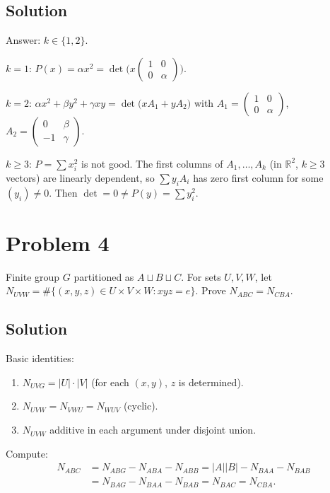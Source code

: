 \documentclass{article}
\begin{document}
\subsection*{Solution}
Answer: $k \in \{1, 2\}$.

$k = 1$: $P(x) = \alpha x^2 = \det\bigl(x \begin{pmatrix}1 & 0\\0 & \alpha\end{pmatrix}\bigr)$.

$k = 2$: $\alpha x^2 + \beta y^2 + \gamma x y = \det\bigl(x A_1 + y A_2\bigr)$ with $A_1 = \begin{pmatrix}1 & 0\\0 & \alpha\end{pmatrix}$, $A_2 = \begin{pmatrix}0 & \beta\\-1 & \gamma\end{pmatrix}$.

$k \ge 3$: $P = \sum x_i^2$ is not good. The first columns of $A_1, \ldots, A_k$ (in $\mathbb{R}^2$, $k \ge 3$ vectors) are linearly dependent, so $\sum y_i A_i$ has zero first column for some $(y_i) \ne 0$. Then $\det = 0 \ne P(y) = \sum y_i^2$.

\section*{Problem 4}
Finite group $G$ partitioned as $A \sqcup B \sqcup C$. For sets $U, V, W$, let $N_{UVW} = \#\{(x,y,z) \in U \times V \times W : xyz = e\}$. Prove $N_{ABC} = N_{CBA}$.

\subsection*{Solution}
Basic identities:
\begin{enumerate}
  \item $N_{UVG} = |U| \cdot |V|$ (for each $(x, y)$, $z$ is determined).
  \item $N_{UVW} = N_{VWU} = N_{WUV}$ (cyclic).
  \item $N_{UVW}$ additive in each argument under disjoint union.
\end{enumerate}

Compute:
\begin{align*}
N_{ABC} &= N_{ABG} - N_{ABA} - N_{ABB} = |A||B| - N_{BAA} - N_{BAB} \\
&= N_{BAG} - N_{BAA} - N_{BAB} = N_{BAC} = N_{CBA}.
\end{align*}
\end{document}
